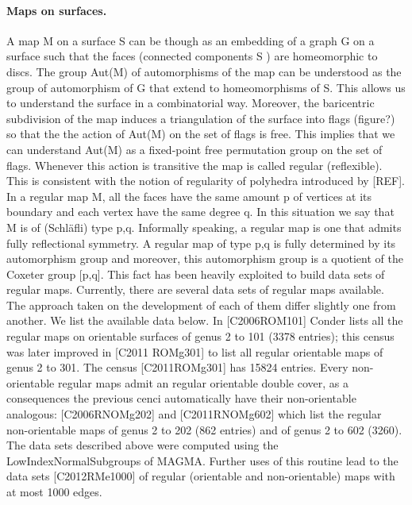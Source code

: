 \paragraph{Maps on surfaces.}
A map M on a surface S can be though as an embedding of a graph G on a surface such that the faces (connected components S ) are homeomorphic to discs. The group Aut(M) of automorphisms of the map can be understood as the group of automorphism of G that extend to homeomorphisms of S. This allows us to understand the surface in a combinatorial way. Moreover, the baricentric subdivision of the map induces a triangulation of the surface into flags (figure?) so that the the action of Aut(M) on the set of flags is free. This implies that we can understand Aut(M) as a fixed-point free permutation group on the set of flags. Whenever this action is transitive the map is called regular (reflexible). This is consistent with the notion of regularity of polyhedra introduced by [REF]. In a regular map M, all the faces have the same amount p of vertices at its boundary and each vertex have the same degree q. In this situation we say that M is of (Schläfli) type {p,q}. Informally speaking, a regular map is one that admits fully reflectional symmetry. A regular map of type {p,q} is fully determined by its automorphism group and moreover, this automorphism group is a quotient of the Coxeter group [p,q]. This fact has been heavily exploited to build data sets of regular maps. Currently, there are several data sets of regular maps available. The approach taken on the development of each of them differ slightly one from another. We list the available data below.
In [C2006ROM101] Conder lists all the regular maps on orientable surfaces of genus 2 to 101 (3378 entries); this census was later improved in [C2011 ROMg301] to list all regular orientable maps of genus 2 to 301. The census [C2011ROMg301] has 15824 entries. Every non-orientable regular maps admit an regular orientable double cover, as a consequences the previous cenci automatically have their non-orientable analogous: [C2006RNOMg202] and [C2011RNOMg602] which list the regular non-orientable maps of genus 2 to 202 (862 entries) and of genus 2 to 602 (3260). The data sets described above were computed using the LowIndexNormalSubgroups of MAGMA. Further uses of this routine lead to the data sets [C2012RMe1000] of regular (orientable and non-orientable) maps with at most 1000 edges.
